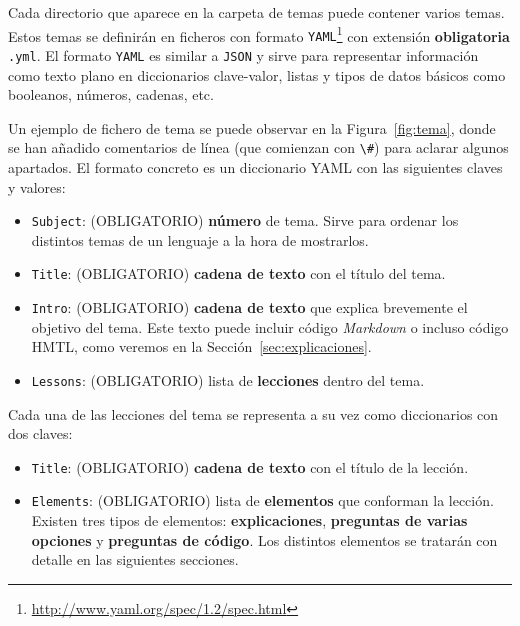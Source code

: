 \documentclass[]{article}
\newcommand{\code}[1]{{\lstinline[basicstyle=\ttfamily,mathescape]!#1!}}
\begin{document}
Cada directorio que aparece en la carpeta de temas puede contener varios temas. Estos temas se definirán en ficheros con formato \code{YAML}\footnote{\url{http://www.yaml.org/spec/1.2/spec.html}} con extensión \textbf{obligatoria} \code{.yml}. El formato \code{YAML} es similar a \code{JSON} y sirve para representar información como texto plano en diccionarios clave-valor, listas y tipos de datos básicos como booleanos, números, cadenas, etc.

Un ejemplo de fichero de tema se puede observar en la Figura~\ref{fig:tema}, donde se han añadido comentarios de línea (que comienzan con \code{\#}) para aclarar algunos apartados. El formato concreto es un diccionario YAML con las siguientes claves y valores:
\begin{itemize}
\item \code{Subject}: {\sf (OBLIGATORIO)} \textbf{número} de tema. Sirve para ordenar los distintos temas de un lenguaje a la hora de mostrarlos.
\item \code{Title}: {\sf (OBLIGATORIO)} \textbf{cadena de texto} con el título del tema. 
\item \code{Intro}: {\sf (OBLIGATORIO)} \textbf{cadena de texto} que explica brevemente el objetivo del tema. Este texto puede incluir código \emph{Markdown} o incluso código HMTL, como veremos en la Sección~\ref{sec:explicaciones}.
\item \code{Lessons}: {\sf (OBLIGATORIO)} lista de \textbf{lecciones} dentro del tema.
\end{itemize}

Cada una de las lecciones del tema se representa a su vez como diccionarios con dos claves:
\begin{itemize}
\item \code{Title}: {\sf (OBLIGATORIO)} \textbf{cadena de texto} con el título de la lección.
\item \code{Elements}: {\sf (OBLIGATORIO)}  lista de \textbf{elementos} que conforman la lección. Existen tres tipos de elementos: \textbf{explicaciones}, \textbf{preguntas de varias opciones} y \textbf{preguntas de código}. Los distintos elementos se tratarán con detalle en las siguientes secciones.
\end{itemize}
\end{document}
